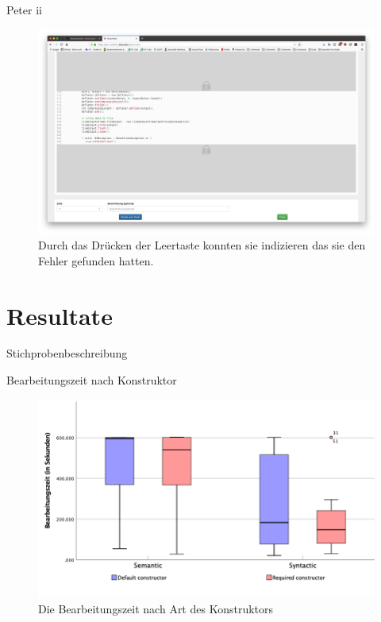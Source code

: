 \documentclass[10pt]{beamer}
\begin{document}
	\begin{frame}{Peter  ii}	
		\begin{figure}
			\includegraphics[scale=0.15]{graphics/peter_correction.png}
			\caption{\label{fig:peter_correction.png} Durch das Drücken der Leertaste konnten sie indizieren das sie den Fehler gefunden hatten.}
		\end{figure}
	\end{frame}

\section{Resultate}

	\begin{frame}{Stichprobenbeschreibung}
	 
	\end{frame}

	\begin{frame}{Bearbeitungszeit nach Konstruktor}
		\begin{figure}
			\includegraphics[scale=0.37]{graphics/box_time-constructor.png}
			\caption{\label{fig:box_time-constructor.png} Die Bearbeitungszeit nach Art des Konstruktors}
		\end{figure}
	\end{frame}
\end{document}
